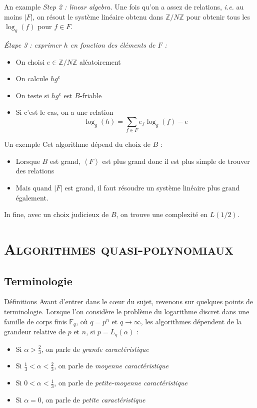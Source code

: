 \documentclass[xcolor=x11names,compress]{beamer}
\theoremstyle{break}
\theoremstyle{sc}
\theoremstyle{definition}
\theoremstyle{remark}
\newcommand{\ie}{\emph{i.e. }}
\begin{document}
\begin{frame}{An example}
  \emph{Step 2 : linear algebra.} Une fois qu'on a assez de relations, \ie au
  moins $|F|$, on résout le système linéaire obtenu dans
  $\mathbb{Z}/N\mathbb{Z}$ pour obtenir tous les $\log_g(f)$ pour $f\in F$.

  \emph{Étape 3 : exprimer $h$ en fonction des éléments de $F$ :}
  \begin{itemize}
    \item On choisi $e\in \mathbb{Z}/N\mathbb{Z}$ aléatoirement
    \item On calcule $hg^e$
    \item On teste si $hg^e$ est $B$-friable
    \item Si c'est le cas, on a une relation
      \[
      \log_g(h) = \sum_{f\in F}e_f\log_g(f) - e
      \]
  \end{itemize}

\end{frame}

\begin{frame}{Un exemple}
  Cet algorithme dépend du choix de $B$ :
  \begin{itemize}
    \item Lorsque $B$ est grand, $\left\langle F \right\rangle$ est plus grand
      donc il est plus simple de trouver des relations
    \item Mais quand $|F|$ est grand, il faut résoudre un système linéaire plus
      grand également.
  \end{itemize}
  In fine, avec un choix judicieux de $B$, on trouve une complexité en
  $L(1/2)$.
\end{frame}

\section{\scshape Algorithmes quasi-polynomiaux}
\subsection{Terminologie}
\begin{frame}{Définitions}
  Avant d'entrer dans le cœur du sujet, revenons sur quelques points de
  terminologie. Lorsque l'on considère le problème du logarithme discret dans
  une famille de corps finis $\mathbb{F}_{q}$, où $q=p^n$ et $q\to\infty$, les
  algorithmes dépendent de la grandeur relative de $p$ et $n$, si
  $p=L_q(\alpha)$ :
  \begin{itemize}
    \item Si $\alpha>\frac{2}{3}$, on parle de \emph{grande caractéristique}
    \item Si $\frac{1}{3} <\alpha<\frac{2}{3}$, on parle de \emph{moyenne caractéristique}
    \item Si $0 <\alpha<\frac{1}{3}$, on parle de \emph{petite-moyenne caractéristique}
    \item Si $\alpha = 0$, on parle de \emph{petite caractéristique}
  \end{itemize}
\end{frame}
\end{document}
